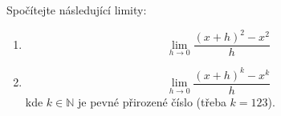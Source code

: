 Spočítejte následující limity:
\begin{enumerate}

	\item  $$\lim_{h \rightarrow 0} \frac{(x+h)^2 - x^2}{h}$$
	
	\item  $$\lim_{h \rightarrow 0} \frac{(x+h)^k - x^k}{h}$$ kde $k \in \mathbb{N}$ je pevné přirozené číslo (třeba $k=123$).

\end{enumerate}

